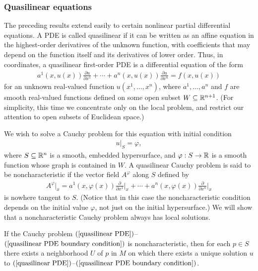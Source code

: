 \subsubsection{Quasilinear equations}
The preceding results extend easily to certain nonlinear partial differential equations. A PDE is called quasilinear if it can be written as an affine equation in the highest-order derivatives of the unknown function, with coefficients that may depend on the function itself and its derivatives of lower order. Thus, in coordinates, a quasilinear first-order PDE is a differential equation of the form
\begin{align}\label{quasilinear PDE}
a^1(x,u(x))\frac{\partial u}{\partial x^1}+\cdots+a^n(x,u(x))\frac{\partial u}{\partial x^n}=f(x,u(x))
\end{align}
for an unknown real-valued function $u(x^1,\dots,x^n)$, where $a^1,\dots,a^n$ and $f$ are smooth real-valued functions defined on some open subset $W\subseteq\mathbb{R}^{n+1}$. (For simplicity, this time we concentrate only on the local problem, and restrict our attention to open subsets of Euclidean space.)\par
We wish to solve a Cauchy problem for this equation with initial condition
\begin{align}\label{quasilinear PDE boundary condition}
u|_S=\varphi,
\end{align}
where $S\subseteq\mathbb{R}^n$ is a smooth, embedded hypersurface, and $\varphi:S\to\mathbb{R}$ is a smooth function whose graph is contained in $W$. A quasilinear Cauchy problem is said to be noncharacteristic if the vector field $A^\varphi$ along $S$ defined by
\begin{align*}
A^\varphi|_x=a^1(x,\varphi(x))\frac{\partial}{\partial x^1}\Big|_x+\cdots+a^n(x,\varphi(x))\frac{\partial}{\partial x^n}\Big|_x
\end{align*}
is nowhere tangent to $S$. (Notice that in this case the noncharacteristic condition depends on the initial value $\varphi$, not just on the initial hypersurface.) We will show that a noncharacteristic Cauchy problem always has local solutions.
\begin{theorem}\label{quasilinear PDE solution}
If the Cauchy problem $(\ref{quasilinear PDE})$--$(\ref{quasilinear PDE boundary condition})$ is noncharacteristic, then for each $p\in S$ there exists a neighborhood $U$ of $p$ in $M$ on which there exists a unique solution $u$ to $(\ref{quasilinear PDE})$--$(\ref{quasilinear PDE boundary condition})$.
\end{theorem}
